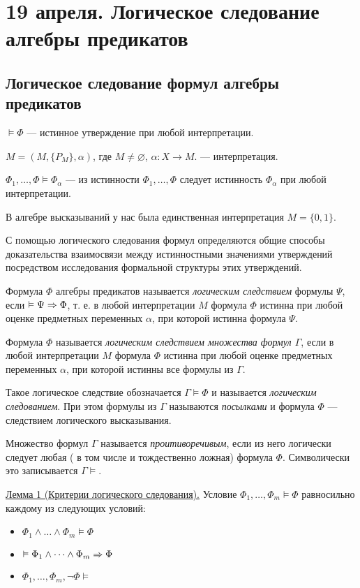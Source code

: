 \chapter{19 апреля. Логическое следование алгебры предикатов}
\section{Логическое следование формул алгебры предикатов}
$\vDash \Phi$ --- истинное утверждение при любой интерпретации.

$M = (M, \{P_M\}, \alpha)$, где $M \neq \varnothing$, $\alpha: X \to M$. --- интерпретация.

$\Phi_1, \dots, \Phi \vDash \Phi_\alpha$ --- из истинности $\Phi_1, \dots, \Phi$ следует истинность $\Phi_\alpha$ при любой интерпретации.

В алгебре высказываний у нас была единственная интерпретация $M = \{0,1\}$.

С помощью логического следования формул определяются общие способы доказательства взаимосвязи между истинностными значениями утверждений посредством исследования формальной структуры этих утверждений.

\dftion Формула $\Phi$ алгебры предикатов называется {\it логическим следствием } формулы $\Psi$, если $\vDash \Psi \Rightarrow \Phi$, т. е. в любой интерпретации $M$ формула $\Phi$ истинна при любой оценке предметных переменных $\alpha$, при которой истинна формула $\Psi$.

\dftion Формула $\Phi$ называется {\it логическим следствием множества формул $\Gamma$}, если в любой интерпретации $M$ формула $\Phi$ истинна при любой оценке предметных переменных $\alpha$, при которой истинны все формулы из $\Gamma$.

Такое логическое следствие обозначается $\Gamma \vDash \Phi$ и называется {\it логическим следованием}. При этом формулы из $\Gamma$ называются {\it посылками} и формула $\Phi$ --- следствием логического высказывания.

\dftion Множество формул $\Gamma$ называется {\it проитиворечивым}, если из него логически следует любая ( в том числе и тождественно ложная) формула $\Phi$. Символически это записывается $\Gamma \vDash $.

\underline{Лемма 1 (Критерии логического следования).} Условие $\Phi_1, \dots, \Phi_m \vDash \Phi$ равносильно каждому из следующих условий:
\begin{itemize}
    \item $\Phi_1 \land \dots \land \Phi_m \vDash \Phi$
    \item $\vDash \Phi_1 \land \dots \land \Phi_m \Rightarrow \Phi$
    \item $\Phi_1, \dots, \Phi_m, \neg \Phi \vDash $
\end{itemize}

